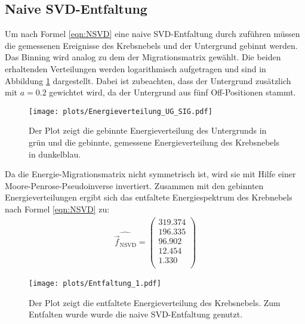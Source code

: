 \subsection{Naive SVD-Entfaltung}
Um nach Formel \eqref{eqn:NSVD} eine naive SVD-Entfaltung durch zuführen müssen die gemessenen Ereignisse des Krebsnebels und der Untergrund gebinnt werden. Das Binning wird analog zu dem der Migrationsmatrix gewählt. Die beiden erhaltenden Verteilungen werden logarithmisch aufgetragen und sind in Abbildung \ref{fig:UG_Sig} dargestellt. Dabei ist zubeachten, dass der Untergrund zusätzlich mit $a=0.2$ gewichtet wird, da der Untergrund aus fünf Off-Positionen stammt.\\
\begin{figure}
  \centering
  \texttt{[image: plots/Energieverteilung\_UG\_SIG.pdf]}
  \caption{Der Plot zeigt die gebinnte Energieverteilung des Untergrunds in grün und die gebinnte, gemessene Energieverteilung des Krebsnebels in dunkelblau.}
  \label{fig:UG_Sig}
\end{figure}
Da die Energie-Migrationsmatrix nicht symmetrisch ist, wird sie mit Hilfe einer Moore-Penrose-Pseudoinverse invertiert. Zusammen mit den gebinnten Energieverteilungen ergibt sich das entfaltete Energiespektrum des Krebnebels nach Formel \eqref{eqn:NSVD} zu:
\begin{align*}
	\hat{\vec{f}_{\text{NSVD}}} = \begin{pmatrix}
			319.374\\
			196.335\\
			96.902\\
			12.454\\
			1.330\\
	\end{pmatrix}
\end{align*}
\begin{figure}
  \centering
  \texttt{[image: plots/Entfaltung\_1.pdf]}
  \caption{Der Plot zeigt die entfaltete Energieverteilung des Krebsnebels. Zum Entfalten wurde wurde die naive SVD-Entfaltung genutzt.}
  \label{fig:E1}
\end{figure}
